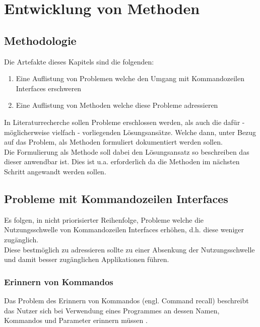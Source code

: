 \documentclass[oneside,bibliography=totocnumbered,BCOR=5mm]{scrbook}
\begin{document}

\chapter{Entwicklung von Methoden}

\section{Methodologie}

Die Artefakte dieses Kapitels sind die folgenden:
\begin{enumerate}
  \item Eine Auflistung von Problemen welche den Umgang mit Kommandozeilen Interfaces erschweren
  \item Eine Auflistung von Methoden welche diese Probleme adressieren
\end{enumerate}

In Literaturrecherche sollen Probleme erschlossen werden, als auch die dafür -
möglicherweise vielfach - vorliegenden Lösungsansätze. Welche dann, unter Bezug
auf das Problem, als Methoden formuliert dokumentiert werden sollen.
\\
Die Formulierung als Methode soll dabei den Lösungsansatz so beschreiben das
dieser anwendbar ist. Dies ist u.a. erforderlich da die Methoden im nächsten
Schritt angewandt werden sollen.

\section{Probleme mit Kommandozeilen Interfaces}

Es folgen, in nicht priorisierter Reihenfolge, Probleme welche die
Nutzungsschwelle von Kommandozeilen Interfaces erhöhen, d.h. diese weniger
zugänglich.
\\
Diese bestmöglich zu adressieren sollte zu einer Absenkung der Nutzungsschwelle
und damit besser zugänglichen Applikationen führen.

\subsection{Erinnern von Kommandos}

Das Problem des Erinnern von Kommandos (engl. Command recall) beschreibt das
Nutzer sich bei Verwendung eines Programmes an dessen Namen, Kommandos und
Parameter erinnern müssen \parencite{Raskin_2008}.
\end{document}
